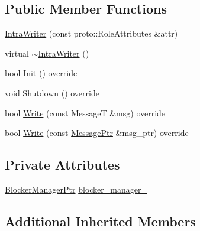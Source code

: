 \subsection*{Public Member Functions}
\begin{DoxyCompactItemize}
\item 
\hyperlink{classapollo_1_1cyber_1_1blocker_1_1IntraWriter_a8aa1a26e062bcebcb5f94bf33d28f8eb}{Intra\-Writer} (const proto\-::\-Role\-Attributes \&attr)
\item 
virtual \hyperlink{classapollo_1_1cyber_1_1blocker_1_1IntraWriter_a98864e9c9712bee3ff0e2be73838a600}{$\sim$\-Intra\-Writer} ()
\item 
bool \hyperlink{classapollo_1_1cyber_1_1blocker_1_1IntraWriter_a31e64a8ffd68620398509723ec9d2481}{Init} () override
\item 
void \hyperlink{classapollo_1_1cyber_1_1blocker_1_1IntraWriter_a61e18b7c53d860a2f141b057177d33a0}{Shutdown} () override
\item 
bool \hyperlink{classapollo_1_1cyber_1_1blocker_1_1IntraWriter_a81d327aca81aee982eba2143f5a8f1d6}{Write} (const Message\-T \&msg) override
\item 
bool \hyperlink{classapollo_1_1cyber_1_1blocker_1_1IntraWriter_a48491a940e99954b19c7eb26710d04b8}{Write} (const \hyperlink{classapollo_1_1cyber_1_1blocker_1_1IntraWriter_a34952ec52c4ab25fdbbbbc5cb17868f4}{Message\-Ptr} \&msg\-\_\-ptr) override
\end{DoxyCompactItemize}
\subsection*{Private Attributes}
\begin{DoxyCompactItemize}
\item 
\hyperlink{classapollo_1_1cyber_1_1blocker_1_1IntraWriter_a92d37eb69d0c02aa8eef3824e24b2f64}{Blocker\-Manager\-Ptr} \hyperlink{classapollo_1_1cyber_1_1blocker_1_1IntraWriter_a9e27c825322758f604452cebf6ce0313}{blocker\-\_\-manager\-\_\-}
\end{DoxyCompactItemize}
\subsection*{Additional Inherited Members}


